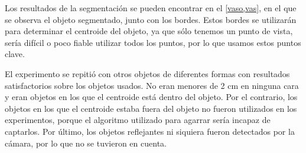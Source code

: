 
Los resultados de la segmentación se pueden encontrar en el \ref{vaso,vas}, en el que se observa el objeto segmentado, junto con los bordes. Estos bordes se utilizarán para determinar el centroide del objeto, ya que sólo tenemos un punto de vista, sería difícil o poco fiable utilizar todos los puntos, por lo que usamos estos puntos clave.

El experimento se repitió con otros objetos de diferentes formas con resultados satisfactorios sobre los objetos usados. No eran menores de 2 cm en ninguna cara y eran objetos en los que el centroide está dentro del objeto. Por el contrario, los objetos en los que el centroide estaba fuera del objeto no fueron utilizados en los experimentos, porque el algoritmo utilizado para agarrar sería incapaz de captarlos. Por último, los objetos reflejantes ni siquiera fueron detectados por la cámara, por lo que no se tuvieron en cuenta.

